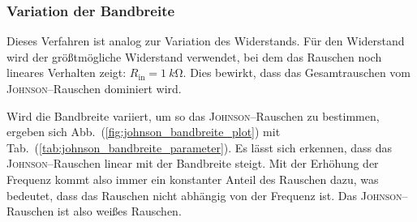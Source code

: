 \documentclass[sn-mathphys-num,iicol]{sn-jnl}
\theoremstyle{thmstyleone}
\theoremstyle{thmstyletwo}
\theoremstyle{thmstylethree}
\begin{document}
\subsubsection{Variation der Bandbreite}
Dieses Verfahren ist analog zur Variation des Widerstands.
Für den Widerstand wird der größtmögliche Widerstand verwendet, bei dem das Rauschen noch lineares Verhalten zeigt: $R_\text{in}=\SI{1}{k\ohm}$.
Dies bewirkt, dass das Gesamtrauschen vom \textsc{Johnson}--Rauschen dominiert wird.

Wird die Bandbreite variiert, um so das \textsc{Johnson}--Rauschen zu bestimmen, ergeben sich Abb.\ (\ref{fig:johnson_bandbreite_plot}) mit Tab.\ (\ref{tab:johnson_bandbreite_parameter}).
Es lässt sich erkennen, dass das \textsc{Johnson}--Rauschen linear mit der Bandbreite steigt.
Mit der Erhöhung der Frequenz kommt also immer ein konstanter Anteil des Rauschen dazu, was bedeutet, dass das Rauschen nicht abhängig von der Frequenz ist.
Das \textsc{Johnson}--Rauschen ist also weißes Rauschen.
\end{document}
